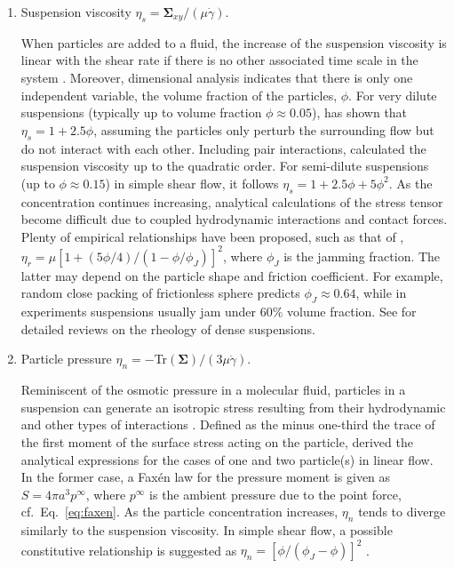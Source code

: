 \begin{enumerate}

\item Suspension viscosity $\eta_s=\bm{\Sigma}_{xy}/(\mu\dot{\gamma})$.

\medskip
When particles are added to a fluid, the increase of the suspension viscosity is linear with the shear rate if there is no other associated time scale in the system \citep{hinch_2011}.
Moreover, dimensional analysis indicates that there is only one independent variable, the volume fraction of the particles, $\phi$.
For very dilute suspensions (typically up to volume fraction $\phi \approx 0.05$), \cite{Einstein_1906, Einstein1911} has shown that $\eta_s = 1 + 2.5\phi$, assuming the particles only perturb the surrounding flow but do not interact with each other.
Including pair interactions, \cite{batchelor_green_1972b} calculated the suspension viscosity up to the quadratic order. For semi-dilute suspensions (up to $\phi \approx 0.15$) in simple shear flow, it follows $\eta_s = 1 + 2.5\phi + 5\phi^2$.
As the concentration continues increasing, analytical calculations of the stress tensor become difficult due to coupled hydrodynamic interactions and contact forces.
Plenty of empirical relationships have been proposed, such as that of \cite{Eilers1941}, $\eta_r=\mu[1+(5\phi/4)/(1-\phi/\phi_J)]^2$, where $\phi_J$ is the jamming fraction.
The latter may depend on the particle shape and friction coefficient.
For example, random close packing of frictionless sphere predicts $\phi_J \approx 0.64$, while in experiments suspensions usually jam under 60\% volume fraction.
See \cite{guazzelli_pouliquen_2018, Morris_annurev2020} for detailed reviews on the rheology of dense suspensions.
\bigskip

\item Particle pressure $\eta_n=-$Tr$(\bm{\Sigma})/(3\mu\dot{\gamma})$.

\medskip
Reminiscent of the osmotic pressure in a molecular fluid, particles in a suspension can generate an isotropic stress resulting from their hydrodynamic and other types of interactions \citep{brady--1993}.
Defined as the minus one-third the trace of the first moment of the surface stress acting on the particle, \cite{Jeffrey_morris_93} derived the analytical expressions for the cases of one and two particle(s) in linear flow. In the former case, a Fax\'{e}n law for the pressure moment is given as $S=4\pi a^3 p^\infty$, where $p^\infty$ is the ambient pressure due to the point force, cf.\ Eq.\ \eqref{eq:faxen}.
As the particle concentration increases, $\eta_n$ tends to diverge similarly to the suspension viscosity.
In simple shear flow, a possible constitutive relationship is suggested as $\eta_n=[\phi/(\phi_J-\phi)]^2$ \citep{Boyer_Guaz_Poul_2011}.
\bigskip


\end{enumerate}
